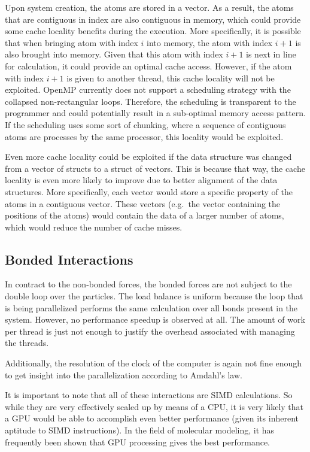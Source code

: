 \documentclass[conference]{IEEEtran}
\begin{document}
Upon system creation, the atoms are stored in a vector. As a result, the atoms that are contiguous in index are also 
contiguous in memory, which could provide some
cache locality benefits during the execution. More specifically, it is possible that when bringing atom with index
$i$ into memory, the atom with index $i+1$ is also brought into memory. Given that this atom with index $i+1$ is next
in line for calculation, it could provide an optimal cache access. However, if the atom with index $i+1$ is given to
another thread, this cache locality will not be exploited. OpenMP currently does not support a scheduling
strategy with the collapsed non-rectangular loops. Therefore, the scheduling is transparent to the programmer
and could potentially result in a sub-optimal memory access pattern. If the scheduling uses some sort of chunking, where
a sequence of contiguous atoms are processes by the same processor, this locality would be exploited.

Even more cache locality could be exploited if the data structure was changed from a vector of structs to a struct 
of vectors. This is because that way, the cache locality is even more likely to improve due to better alignment of
the data structures. More specifically, each vector would store a specific property of the atoms in a contiguous vector.
These vectors (e.g.\ the vector containing the positions of the atoms) would contain the data of a larger number of
atoms, which would reduce the number of cache misses.

\subsection{Bonded Interactions}
In contract to the non-bonded forces, the bonded forces are not subject to the double loop over the particles.
The load balance is 
uniform because the loop that is being parallelized performs the same calculation over all bonds present in the
system.
However,
no performance speedup is observed at all. The amount of work per thread is just not enough to justify the overhead
associated with managing the threads.

Additionally, the resolution of the clock of the computer is again not fine enough to get insight into the parallelization
according to Amdahl's law.


It is important to note that all of these
interactions are SIMD calculations. So while they are very effectively scaled up by means of a CPU, it is very likely
that a GPU would be able to accomplish even better performance (given its inherent aptitude to SIMD instructions). 
In the field of molecular modeling, it has frequently been shown that GPU processing gives the best performance.~\cite{eastman2010openmm}
\end{document}
